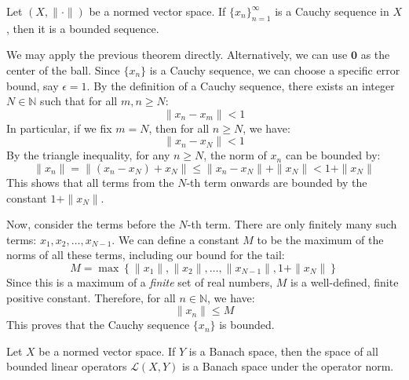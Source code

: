 \begin{corollary}
Let $(X, \|\cdot\|)$ be a normed vector space. If $\{x_n\}_{n=1}^\infty$ is a Cauchy sequence in $X$, then it is a bounded sequence.
\end{corollary}

\begin{pfbox}
We may apply the previous theorem directly. 
Alternatively, we can use $\mathbf{0}$ as the center of the ball.
Since $\{x_n\}$ is a Cauchy sequence, we can choose a specific error bound, say $\epsilon = 1$. 
By the definition of a Cauchy sequence, there exists an integer $N \in \mathbb{N}$ such that for all $m, n \ge N$:
\[ \|x_n - x_m\| < 1 \]
In particular, if we fix $m = N$, then for all $n \ge N$, we have:
\[ \|x_n - x_N\| < 1 \]
By the triangle inequality, for any $n \ge N$, the norm of $x_n$ can be bounded by:
\[ \|x_n\| = \|(x_n - x_N) + x_N\| \le \|x_n - x_N\| + \|x_N\| < 1 + \|x_N\| \]
This shows that all terms from the $N$-th term onwards are bounded by the constant $1 + \|x_N\|$.

Now, consider the terms before the $N$-th term. There are only finitely many such terms: $x_1, x_2, \dots, x_{N-1}$. 
We can define a constant $M$ to be the maximum of the norms of all these terms, including our bound for the tail:
\[ M = \max \left\{ \|x_1\|, \|x_2\|, \dots, \|x_{N-1}\|, 1 + \|x_N\| \right\} \]
Since this is a maximum of a \textit{finite} set of real numbers, $M$ is a well-defined, finite positive constant.
Therefore, for all $n \in \mathbb{N}$, we have:
\[ \|x_n\| \le M \]
This proves that the Cauchy sequence $\{x_n\}$ is bounded.
\end{pfbox}


\begin{theorem}
Let $X$ be a normed vector space. If $Y$ is a Banach space, then the space of all bounded linear operators $\mathcal{L}(X,Y)$ is a Banach space under the operator norm.
\end{theorem}

